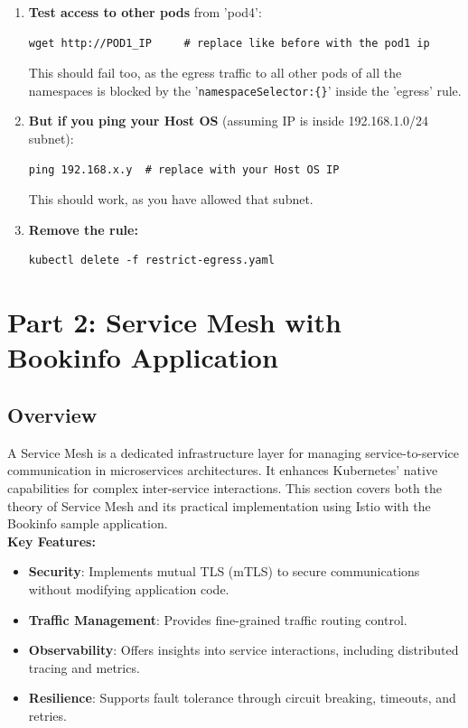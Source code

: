 \documentclass{article}
\begin{document}
\begin{enumerate}
    \item \textbf{Test access to other pods} from 'pod4':
    \begin{lstlisting}
wget http://POD1_IP     # replace like before with the pod1 ip
    \end{lstlisting}
    This should fail too, as the egress traffic to all other pods of all the namespaces is blocked by the '\texttt{namespaceSelector:\{\}}' inside the 'egress' rule.

    \item \textbf{But if you ping your Host OS} (assuming IP is inside 192.168.1.0/24 subnet):
    \begin{lstlisting}
ping 192.168.x.y  # replace with your Host OS IP
    \end{lstlisting}
    This should work, as you have allowed that subnet.

    \item \textbf{Remove the rule:}
    \begin{lstlisting}
kubectl delete -f restrict-egress.yaml
    \end{lstlisting}

\end{enumerate}

\newpage

\section{Part 2: Service Mesh with Bookinfo Application}
\subsection{Overview}

A Service Mesh is a dedicated infrastructure layer for managing service-to-service communication in microservices architectures. It enhances Kubernetes' native capabilities for complex inter-service interactions. This section covers both the theory of Service Mesh and its practical implementation using Istio with the Bookinfo sample application. \\  

\textbf{Key Features:}
\begin{itemize}
    \item \textbf{Security}: Implements mutual TLS (mTLS) to secure communications without modifying application code.
    \item \textbf{Traffic Management}: Provides fine-grained traffic routing control.
    \item \textbf{Observability}: Offers insights into service interactions, including distributed tracing and metrics.
    \item \textbf{Resilience}: Supports fault tolerance through circuit breaking, timeouts, and retries.  \\
\end{itemize}
\end{document}
